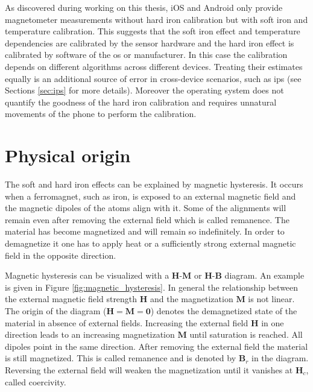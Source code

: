 As discovered during working on this thesis, iOS and Android only provide magnetometer measurements without hard iron calibration but with soft iron and temperature calibration. This suggests that the soft iron effect and temperature dependencies are calibrated by the sensor hardware and the hard iron effect is calibrated by software of the \gls{os} or manufacturer. In this case the calibration depends on different algorithms across different devices. Treating their estimates equally is an additional source of error in cross-device scenarios, such as \gls{ips} (see Sections \ref{sec:ips} for more details). Moreover the operating system does not quantify the goodness of the hard iron calibration and requires unnatural movements of the phone to perform the calibration.

\section{Physical origin}

The soft and hard iron effects can be explained by magnetic hysteresis. It occurs when a ferromagnet, such as iron, is exposed to an external magnetic field and the magnetic dipoles of the atoms align with it. Some of the alignments will remain even after removing the external field which is called remanence. The material has become magnetized and will remain so indefinitely. In order to demagnetize it one has to apply heat or a sufficiently strong external magnetic field in the opposite direction.

Magnetic hysteresis can be visualized with a $\bm{H}$-$\bm{M}$ or $\bm{H}$-$\bm{B}$ diagram. An example is given in Figure \ref{fig:magnetic_hysteresis}. In general the relationship between the external magnetic field strength $\bm{H}$ and the magnetization $\bm{M}$ is not linear. The origin of the diagram ($\bm{H}=\bm{M}=\bm{0}$) denotes the demagnetized state of the material in absence of external fields. Increasing the external field $\bm{H}$ in one direction leads to an increasing magnetization $\bm{M}$ until saturation is reached. All dipoles point in the same direction. After removing the external field the material is still magnetized. This is called remanence and is denoted by $\bm{B}_r$ in the diagram. Reversing the external field will weaken the magnetization until it vanishes at $\bm{H}_c$, called coercivity.

